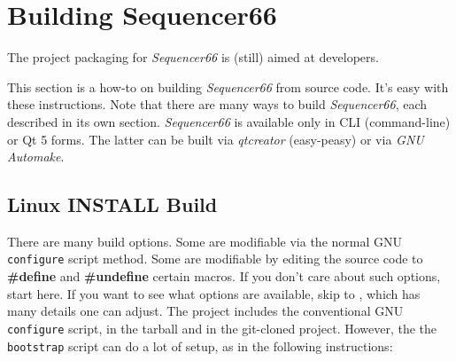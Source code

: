 %
%
%

\section{Building Sequencer66}
\label{sec:seq66_build}

   The project packaging for \textsl{Sequencer66}
   is (still) aimed at developers.

   This section is a how-to on building
   \textsl{Sequencer66} from source code.  It's easy with
   these instructions. Note that there are many ways to build
   \textsl{Sequencer66}, each described in its own section.
   \textsl{Sequencer66} is available only in CLI (command-line) or Qt 5 forms.
   The latter can be built via \textsl{qtcreator} (easy-peasy)
   or via \textsl{GNU Automake}.

\subsection{Linux INSTALL Build}
\label{subsec:seq66_build_install}

   There are many build options.  Some are modifiable via the normal GNU
   \texttt{configure} script method.  Some are modifiable by
   editing the source code to \textbf{\#define} and \textbf{\#undefine} certain
   macros.  If you don't care about such options, start here.
   If you want to see what options are available, skip to
   , which has many details one can
   adjust.
   The project includes the conventional GNU \texttt{configure} script, in the
   tarball and in the git-cloned project.  However, the
   the \texttt{bootstrap} script can do a lot of setup,
   as in the following instructions:

